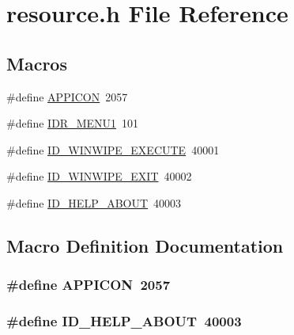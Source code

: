 \section{resource.\-h File Reference}
\label{resource_8h}
\subsection*{Macros}
\begin{DoxyCompactItemize}
\item 
\#define \hyperlink{resource_8h_a6e46dc7934f06a8a8237fe83514707eb}{A\-P\-P\-I\-C\-O\-N}~2057
\item 
\#define \hyperlink{resource_8h_a06a7fc23695fe1e5b76ab4be087c18e8}{I\-D\-R\-\_\-\-M\-E\-N\-U1}~101
\item 
\#define \hyperlink{resource_8h_af017bd0beef125ea3423c8cfd7a11cd5}{I\-D\-\_\-\-W\-I\-N\-W\-I\-P\-E\-\_\-\-E\-X\-E\-C\-U\-T\-E}~40001
\item 
\#define \hyperlink{resource_8h_a7cff73340c26032c42b9a1458689dd13}{I\-D\-\_\-\-W\-I\-N\-W\-I\-P\-E\-\_\-\-E\-X\-I\-T}~40002
\item 
\#define \hyperlink{resource_8h_ae175225c71f50ea7932bf7704658f0af}{I\-D\-\_\-\-H\-E\-L\-P\-\_\-\-A\-B\-O\-U\-T}~40003
\end{DoxyCompactItemize}


\subsection{Macro Definition Documentation}
\subsubsection[{A\-P\-P\-I\-C\-O\-N}]{\setlength{\rightskip}{0pt plus 5cm}\#define A\-P\-P\-I\-C\-O\-N~2057}\label{resource_8h_a6e46dc7934f06a8a8237fe83514707eb}
\subsubsection[{I\-D\-\_\-\-H\-E\-L\-P\-\_\-\-A\-B\-O\-U\-T}]{\setlength{\rightskip}{0pt plus 5cm}\#define I\-D\-\_\-\-H\-E\-L\-P\-\_\-\-A\-B\-O\-U\-T~40003}\label{resource_8h_ae175225c71f50ea7932bf7704658f0af}
